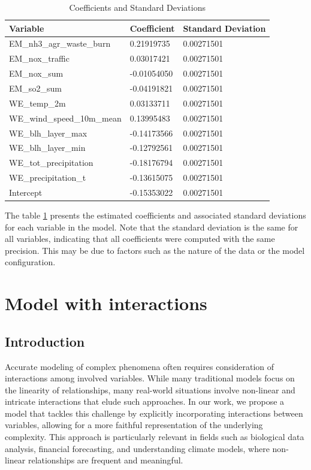 \documentclass[10pt]{article} %
\begin{document}
    \begin{table}[htbp]
    \centering
    \label{tab:coefficients}
    \begin{tabular}{lll}
    \hline
    \textbf{Variable} & \textbf{Coefficient} & \textbf{Standard Deviation} \\
    \hline
    EM\_nh3\_agr\_waste\_burn & 0.21919735 & 0.00271501 \\
    EM\_nox\_traffic & 0.03017421 & 0.00271501 \\
    EM\_nox\_sum & -0.01054050 & 0.00271501 \\
    EM\_so2\_sum & -0.04191821 & 0.00271501 \\
    WE\_temp\_2m & 0.03133711 & 0.00271501 \\
    WE\_wind\_speed\_10m\_mean & 0.13995483 & 0.00271501 \\
    WE\_blh\_layer\_max & -0.14173566 & 0.00271501 \\
    WE\_blh\_layer\_min & -0.12792561 & 0.00271501 \\
    WE\_tot\_precipitation & -0.18176794 & 0.00271501 \\
    WE\_precipitation\_t & -0.13615075 & 0.00271501 \\
    Intercept &  -0.15353022 &  0.00271501 \\
    \hline
    \end{tabular}
    \caption{Coefficients and Standard Deviations}
    \label{table:kysymys}
    \end{table}

 The table \ref{table:kysymys} presents the estimated coefficients and associated standard deviations for each variable in the model. 
 Note that the standard deviation is the same for all variables, indicating that all coefficients were computed with the same precision. 
 This may be due to factors such as the nature of the data or the model configuration.
\section{Model with interactions}
    \subsection{Introduction}
    Accurate modeling of complex phenomena often requires consideration of interactions among involved variables. While many traditional models focus on the linearity of relationships, many real-world situations involve non-linear and intricate interactions that elude such approaches. In our work, we propose a model that tackles this challenge by explicitly incorporating interactions between variables, allowing for a more faithful representation of the underlying complexity. This approach is particularly relevant in fields such as biological data analysis, financial forecasting, and understanding climate models, where non-linear relationships are frequent and meaningful.
\end{document}
